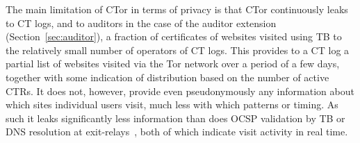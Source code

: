 The main limitation of CTor in terms of privacy is that CTor continuously leaks
to CT logs, and to auditors in the case of the auditor extension
(Section~\ref{sec:auditor}), a fraction of certificates of websites
visited using TB to the relatively small number of operators of CT
logs.  This provides to a CT log a partial list of websites visited
via the Tor network over a period of a few days, together with some
indication of distribution based on the number of active CTRs. It does
not, however, provide even pseudonymously any information about which
sites individual users visit, much less with which patterns or timing.
As such it leaks significantly less information than does OCSP
validation by TB or DNS resolution at exit-relays~\cite{TorDNS}, both
of which indicate visit activity in real time.

